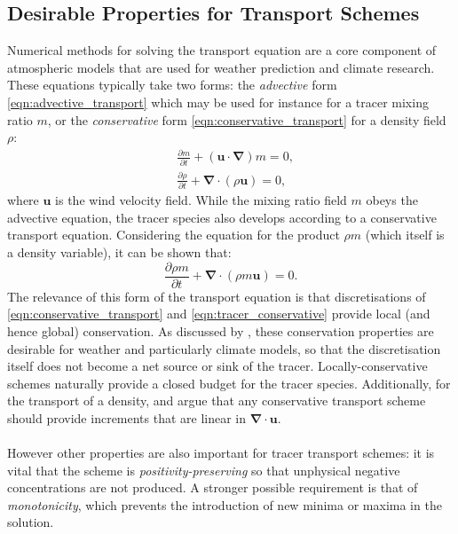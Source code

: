 \documentclass[11pt,a4paper]{article}
\newcommand{\pfrac}[2]{\frac{\partial{#1}}{\partial{#2}}}
\begin{document}
\subsection{Desirable Properties for Transport Schemes}
Numerical methods for solving the transport equation are a core component of atmospheric models that are used for weather prediction and climate research.
These equations typically take two forms: the \textit{advective} form \eqref{eqn:advective_transport} which may be used for instance for a tracer mixing ratio $m$, or the \textit{conservative} form \eqref{eqn:conservative_transport} for a density field $\rho$:
\begin{subequations}
\begin{align}
& \pfrac{m}{t} + \left(\bm{u\cdot\nabla}\right)m = 0, \label{eqn:advective_transport} \\
& \pfrac{\rho}{t} + \bm{\nabla\cdot}\left(\rho\bm{u}\right) = 0, \label{eqn:conservative_transport}
\end{align}
\end{subequations}
where $\bm{u}$ is the wind velocity field.
While the mixing ratio field $m$ obeys the advective equation, the tracer species also develops according to a conservative transport equation.
Considering the equation for the product $\rho m$ (which itself is a density variable), it can be shown that:
\begin{equation}
\pfrac{\rho m}{t} + \bm{\nabla\cdot}\left(\rho m\bm{u}\right) = 0. \label{eqn:tracer_conservative}
\end{equation}
The relevance of this form of the transport equation is that discretisations of \eqref{eqn:conservative_transport} and \eqref{eqn:tracer_conservative} provide local (and hence global) conservation.
As discussed by \cite{thuburn2008some}, these conservation properties are desirable for weather and particularly climate models, so that the discretisation itself does not become a net source or sink of the tracer.
Locally-conservative schemes naturally provide a closed budget for the tracer species. 
Additionally, for the transport of a density, \citet{lin1996ffsl} and \citet{melvin2024mixed} argue that any conservative transport scheme should provide increments that are linear in $\bm{\nabla\cdot u}$. 
\\
\\
However other properties are also important for tracer transport schemes: it is vital that the scheme is \textit{positivity-preserving} so that unphysical negative concentrations are not produced.
A stronger possible requirement is that of \textit{monotonicity}, which prevents the introduction of new minima or maxima in the solution.
\end{document}
